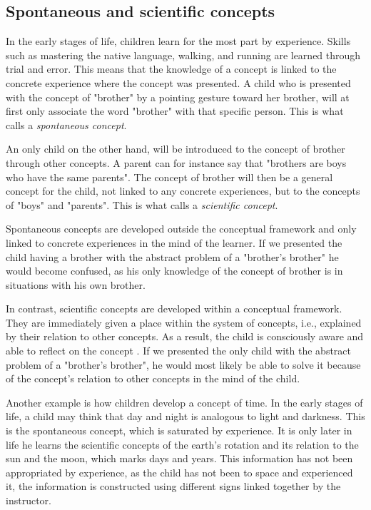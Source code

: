 \subsection{Spontaneous and scientific concepts} \label{cha:spontaneous_scientific}
In the early stages of life, children learn for the most part by experience. Skills such as mastering the native language, walking, and running are learned through trial and error. This means that the knowledge of a concept is linked to the concrete experience where the concept was presented. A child who is presented with the concept of "brother" by a pointing gesture toward her brother, will at first only associate the word "brother" with that specific person. This is what \citeauthor{vygotsky2012thought} calls a \emph{spontaneous concept}.

An only child on the other hand, will be introduced to the concept of brother through other concepts. A parent can for instance say that "brothers are boys who have the same parents". The concept of brother will then be a general concept for the child, not linked to any concrete experiences, but to the concepts of "boys" and "parents". This is what \citeauthor{vygotsky2012thought} calls a \emph{scientific concept}.

Spontaneous concepts are developed outside the conceptual framework and only linked to concrete experiences in the mind of the learner. If we presented the child having a brother with the abstract problem of a "brother's brother" \citep{vygotsky2012thought} he would become confused, as his only knowledge of the concept of brother is in situations with his own brother.

In contrast, scientific concepts are developed within a conceptual framework. They are immediately given a place within the system of concepts, i.e., explained by their relation to other concepts. As a result, the child is consciously aware and able to reflect on the concept \citep{van1998concept}. If we presented the only child with the abstract problem of a "brother's brother", he would most likely be able to solve it because of the concept's relation to other concepts in the mind of the child. 

Another example is how children develop a concept of time. In the early stages of life, a child may think that day and night is analogous to light and darkness. This is the spontaneous concept, which is saturated by experience. It is only later in life he learns the scientific concepts of the earth's rotation and its relation to the sun and the moon, which marks days and years. This information has not been appropriated by experience, as the child has not been to space and experienced it, the information is constructed using different signs linked together by the instructor. 

